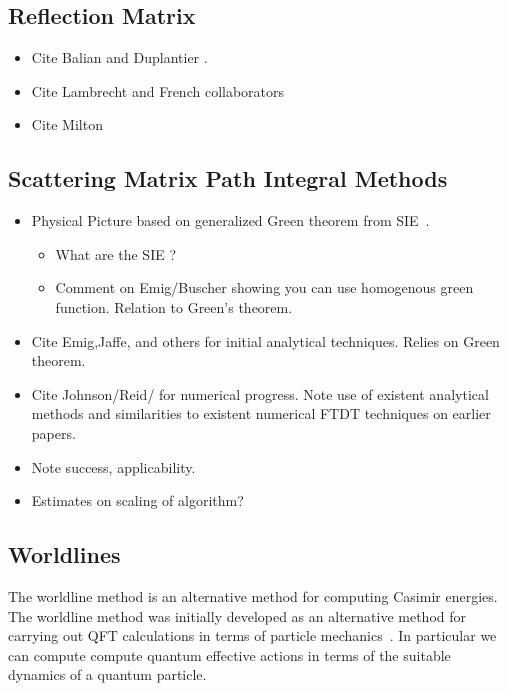 \subsection{Reflection Matrix}

\begin{itemize}
\item Cite Balian and Duplantier \cite{Balian1977, Balian1978}.
\item Cite Lambrecht and French collaborators
  \cite{Lambrecht2006, MaiaNeto2008,Canaguier-Durand2012}
\item Cite Milton
\end{itemize}

\subsection{Scattering Matrix Path Integral Methods}

\begin{itemize}
\item Physical Picture based on generalized Green theorem from SIE~.
\begin{itemize}
\item What are the SIE ?  
\item Comment on Emig/Buscher showing you can use homogenous green function.  Relation to Green's theorem.
\end{itemize}

\item Cite Emig,Jaffe,  and others for initial analytical techniques.  Relies on Green theorem.
\cite{Emig2004, Emig2007, Rahi2009}
\item Cite Johnson/Reid/ for numerical progress.  Note use of existent analytical methods and similarities to existent numerical FTDT techniques on earlier papers.  \cite{Reid2009,Reid2011, Reid2013} \cite{Rodriguez2007,Rodriguez2007a, Rodriguez2009}
\item Note success, applicability.  
\item Estimates on scaling of algorithm?
\end{itemize}

\subsection{Worldlines}

The worldline method is an alternative method for computing Casimir energies.  The worldline method was initially developed as an alternative method for carrying out QFT calculations in terms of particle mechanics~\cite{McKeon1993, Strassler1992,Schubert2001}.  In particular we can compute compute quantum effective actions in terms of the suitable dynamics of a quantum particle.  

